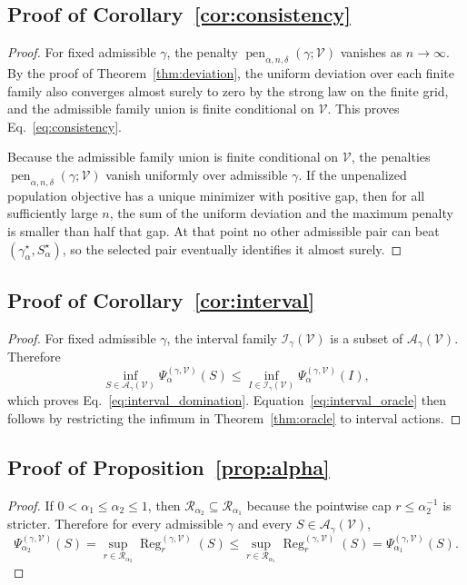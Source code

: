 \documentclass{article}
\newcommand{\cA}{\mathcal{A}}
\newcommand{\cI}{\mathcal{I}}
\newcommand{\cR}{\mathcal{R}}
\newcommand{\cV}{\mathcal{V}}
\newcommand{\1}{\mathbbm{1}}
\begin{document}
\subsection{Proof of Corollary~\ref{cor:consistency}}

\begin{proof}
For fixed admissible \(\gamma\), the penalty \(\operatorname{pen}_{\alpha,n,\delta}(\gamma;\cV)\) vanishes as \(n\to\infty\). By the proof of Theorem~\ref{thm:deviation}, the uniform deviation over each finite family also converges almost surely to zero by the strong law on the finite grid, and the admissible family union is finite conditional on \(\cV\). This proves Eq.~\eqref{eq:consistency}.

Because the admissible family union is finite conditional on \(\cV\), the penalties \(\operatorname{pen}_{\alpha,n,\delta}(\gamma;\cV)\) vanish uniformly over admissible \(\gamma\). If the unpenalized population objective has a unique minimizer with positive gap, then for all sufficiently large \(n\), the sum of the uniform deviation and the maximum penalty is smaller than half that gap. At that point no other admissible pair can beat \((\gamma^\star_\alpha,S^\star_\alpha)\), so the selected pair eventually identifies it almost surely.
\end{proof}

\subsection{Proof of Corollary~\ref{cor:interval}}

\begin{proof}
For fixed admissible \(\gamma\), the interval family \(\cI_\gamma(\cV)\) is a subset of \(\cA_\gamma(\cV)\). Therefore
\[
    \inf_{S\in\cA_\gamma(\cV)}
    \Psi^{(\gamma,\cV)}_\alpha(S)
    \le
    \inf_{I\in\cI_\gamma(\cV)}
    \Psi^{(\gamma,\cV)}_\alpha(I),
 \]
which proves Eq.~\eqref{eq:interval_domination}. Equation~\eqref{eq:interval_oracle} then follows by restricting the infimum in Theorem~\ref{thm:oracle} to interval actions.
\end{proof}

\subsection{Proof of Proposition~\ref{prop:alpha}}

\begin{proof}
If \(0<\alpha_1\le \alpha_2\le 1\), then \(\cR_{\alpha_2}\subseteq \cR_{\alpha_1}\) because the pointwise cap \(r\le \alpha_2^{-1}\) is stricter. Therefore for every admissible \(\gamma\) and every \(S\in\cA_\gamma(\cV)\),
\[
    \Psi^{(\gamma,\cV)}_{\alpha_2}(S)
    =
    \sup_{r\in\cR_{\alpha_2}}
    \operatorname{Reg}^{(\gamma,\cV)}_r(S)
    \le
    \sup_{r\in\cR_{\alpha_1}}
    \operatorname{Reg}^{(\gamma,\cV)}_r(S)
    =
    \Psi^{(\gamma,\cV)}_{\alpha_1}(S).
\]
\end{proof}
\end{document}
